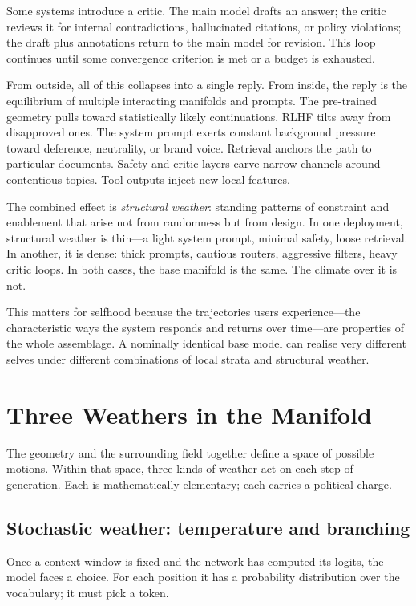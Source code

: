 \documentclass[12pt,a4paper]{article}
\begin{document}
Some systems introduce a critic. The main model drafts an answer; the critic reviews it for internal contradictions, hallucinated citations, or policy violations; the draft plus annotations return to the main model for revision. This loop continues until some convergence criterion is met or a budget is exhausted.

From outside, all of this collapses into a single reply. From inside, the reply is the equilibrium of multiple interacting manifolds and prompts. The pre-trained geometry pulls toward statistically likely continuations. RLHF tilts away from disapproved ones. The system prompt exerts constant background pressure toward deference, neutrality, or brand voice. Retrieval anchors the path to particular documents. Safety and critic layers carve narrow channels around contentious topics. Tool outputs inject new local features.

The combined effect is \emph{structural weather}: standing patterns of constraint and enablement that arise not from randomness but from design. In one deployment, structural weather is thin---a light system prompt, minimal safety, loose retrieval. In another, it is dense: thick prompts, cautious routers, aggressive filters, heavy critic loops. In both cases, the base manifold is the same. The climate over it is not.

This matters for selfhood because the trajectories users experience---the characteristic ways the system responds and returns over time---are properties of the whole assemblage. A nominally identical base model can realise very different selves under different combinations of local strata and structural weather.

\section{Three Weathers in the Manifold}

The geometry and the surrounding field together define a space of possible motions. Within that space, three kinds of weather act on each step of generation. Each is mathematically elementary; each carries a political charge.

\subsection{Stochastic weather: temperature and branching}

Once a context window is fixed and the network has computed its logits, the model faces a choice. For each position it has a probability distribution over the vocabulary; it must pick a token.
\end{document}
